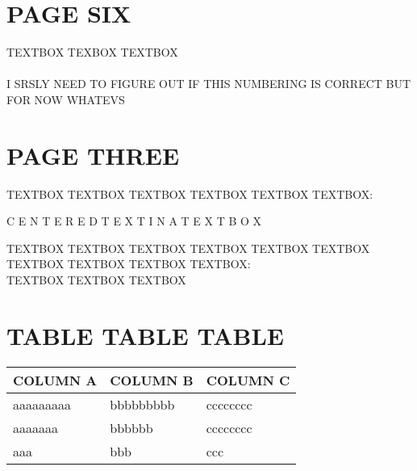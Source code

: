 \documentclass[a4paper,landscape]{article}
\begin{document}
\begin{minipage}[t]{0.45\linewidth}
        \vspace*{0.09\textheight}
        \section*{PAGE SIX}
            \begin{center}
                \parbox{4.5in}{TEXTBOX TEXBOX TEXTBOX \\ \\
                I SRSLY NEED TO FIGURE OUT IF THIS NUMBERING IS CORRECT BUT FOR NOW WHATEVS}
            \end{center}
\end{minipage}%
\hspace{0.75in}
\begin{minipage}[t]{0.45\linewidth}
            \vspace*{0.125\textheight}
            \section*{PAGE THREE}
              \begin{center}
              \parbox{4.5in}{TEXTBOX TEXTBOX TEXTBOX TEXTBOX TEXTBOX TEXTBOX:
               
                 \begin{center}
                   C E N T E R E D    T E X T    I N    A    T E X T B O X
                  \end{center}
                
                TEXTBOX TEXTBOX TEXTBOX TEXTBOX TEXTBOX TEXTBOX TEXTBOX TEXTBOX TEXTBOX TEXTBOX: \\
            
               
               TEXTBOX TEXTBOX TEXTBOX
            }
            \end{center}
        \vspace*{0.02\textheight}
        \section*{TABLE TABLE TABLE}
            \begin{center}
                \begin{tabu} to 0.955\textwidth { | X[l] | X[c] | X[r] | }
                \hline
              
                COLUMN A & COLUMN B & COLUMN C\\[2pt]
               \hline\hline
                    aaaaaaaaa & bbbbbbbbb & cccccccc \\[2pt]
                \hline
                    aaaaaaa & bbbbbb & cccccccc  \\[2pt]
                \hline
                    aaa & bbb & ccc \\[2pt]
                \hline
                \end{tabu}
            \end{center}
\end{minipage}%
\end{document}
